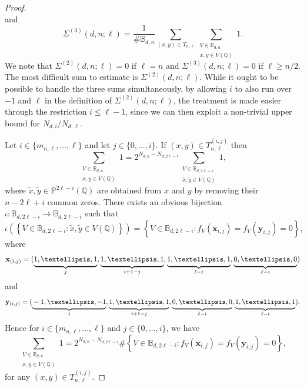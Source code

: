 \documentclass[10pt,a4paper]{amsart}
\newcommand{\QQ}{\mathbb{Q}}
\newcommand{\xx}{\mathbf{x}}
\newcommand{\yy}{\mathbf{y}}
\renewcommand{\geq}{\geqslant}
\renewcommand{\leq}{\leqslant}
\begin{document}
\begin{proof}
\begin{equation*}
\end{equation*}
and
\begin{equation*}
\Sigma^{(3)}(d,n;\ell) = \frac1{\# \mathbb{B}_{d,n}} \sum_{(x, y) \in T_{n,\ell}} \sum_{\substack{V \in \mathbb{B}_{d,n} \\ x, y \in V(\mathbb{Q})}} 1.
\end{equation*}
We note  that $\Sigma^{(2)}(d,n;\ell)=0$ if $\ell=n$ and $\Sigma^{(3)}(d,n;\ell)=0$ if $\ell \geq n/2$.
The most difficult sum to estimate is  
$\Sigma^{(2)}(d,n;\ell)$. While it ought to be possible to handle the three sums simultaneously, 
by allowing $i$ to also run over $-1$ and $\ell$ in the definition of $\Sigma^{(2)}(d,n;\ell)$, the treatment is  made easier through the restriction $i\leq \ell-1$, since we can then exploit a non-trivial upper bound for $N_{d,i}/N_{d,\ell}.$ 



Let $i\in \{m_{n,\ell},\dots,\ell\}$ and let $j\in \{0,\dots,i\}$. If $(x,y)\in T_{n,\ell}^{(i,j)}$ then 
$$
\sum_{\substack{V \in \mathbb{B}_{d,n} \\ x, y \in V(\mathbb{Q})}} 1=
2^{N_{d,n}-N_{d,2\ell-i}} 
\sum_{\substack{V \in \mathbb{B}_{d,2\ell-i} \\ \tilde x, \tilde y \in V(\mathbb{Q})}} 1,
$$
where $\tilde x, \tilde y\in \mathbb{P}^{2\ell-i}(\QQ)$ are obtained from $x$ and $y$ by removing their $n-2\ell+i$ common zeros. There exists an obvious bijection 
$\iota:  \mathbb{B}_{d,2\ell-i}\to \mathbb{B}_{d,2\ell-i}$ such that 
$$
\iota\left(
\left\{ 
V \in \mathbb{B}_{d,2\ell-i}: \tilde x, \tilde y \in V(\mathbb{Q})\right\}\right)=
\left\{ 
V \in \mathbb{B}_{d,2\ell-i} : f_V(\xx_{i,j})=f_V(\yy_{i,j})=0\right\},
$$
where
$$
\xx_{(i,j)} = (\underbrace{\strut 1 , \ldots , 1}_{j} , \underbrace{\strut 1 , \dots , 1}_{i+1-j} , 
\underbrace{\strut 1 , \dots , 1}_{\ell-i} , \underbrace{\strut 0 , \dots , 0}_{\ell-i})
$$
and 
$$
\yy_{(i,j)} = (\underbrace{\strut -1 , \dots , -1}_{j} , \underbrace{\strut 1 , \dots , 1}_{i+1-j} , 
\underbrace{\strut 0 , \dots , 0}_{\ell-i} , \underbrace{\strut 1 , \dots , 1}_{\ell-i}).
$$
Hence for 
 $i\in \{m_{n,\ell},\dots,\ell\}$ and $j\in \{0,\dots,i\}$, we have 
\begin{equation}\label{eq:**}
\sum_{\substack{V \in \mathbb{B}_{d,n} \\ x, y \in V(\mathbb{Q})}} 1=
2^{N_{d,n}-N_{d,2\ell-i}} 
\#\left\{V \in \mathbb{B}_{d,2\ell-i} :
f_V(\xx_{i,j})=f_V(\yy_{i,j})=0\right\},
\end{equation}
for  any $(x,y)\in T_{n,\ell}^{(i,j)}$.


\end{proof}
\end{document}
